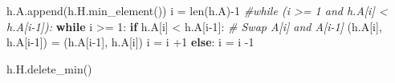 \documentclass[
]{article}
\newenvironment{Shaded}{}{}
\newcommand{\BuiltInTok}[1]{\textcolor[rgb]{0.00,0.50,0.00}{#1}}
\newcommand{\CommentTok}[1]{\textcolor[rgb]{0.38,0.63,0.69}{\textit{#1}}}
\newcommand{\ControlFlowTok}[1]{\textcolor[rgb]{0.00,0.44,0.13}{\textbf{#1}}}
\newcommand{\DecValTok}[1]{\textcolor[rgb]{0.25,0.63,0.44}{#1}}
\newcommand{\NormalTok}[1]{#1}
\newcommand{\OperatorTok}[1]{\textcolor[rgb]{0.40,0.40,0.40}{#1}}
\begin{document}
\begin{Shaded}
\begin{Highlighting}[]
\NormalTok{        h.A.append(h.H.min\_element())}
\NormalTok{        i }\OperatorTok{=} \BuiltInTok{len}\NormalTok{(h.A)}\OperatorTok{{-}}\DecValTok{1}
        \CommentTok{\#while (i \textgreater{}= 1 and h.A[i] \textless{} h.A[i{-}1]):}
        \ControlFlowTok{while}\NormalTok{ i }\OperatorTok{\textgreater{}=} \DecValTok{1}\NormalTok{:}
          \ControlFlowTok{if}\NormalTok{ h.A[i] }\OperatorTok{\textless{}}\NormalTok{ h.A[i}\OperatorTok{{-}}\DecValTok{1}\NormalTok{]:}
            \CommentTok{\# Swap A[i] and A[i{-}1]}
\NormalTok{            (h.A[i], h.A[i}\OperatorTok{{-}}\DecValTok{1}\NormalTok{]) }\OperatorTok{=}\NormalTok{ (h.A[i}\OperatorTok{{-}}\DecValTok{1}\NormalTok{], h.A[i])}
\NormalTok{            i }\OperatorTok{=}\NormalTok{ i }\OperatorTok{+}\DecValTok{1}
          \ControlFlowTok{else}\NormalTok{:}
\NormalTok{            i }\OperatorTok{=}\NormalTok{ i }\OperatorTok{{-}}\DecValTok{1}

\NormalTok{        h.H.delete\_min()}




\end{Highlighting}
\end{Shaded}
\end{document}
